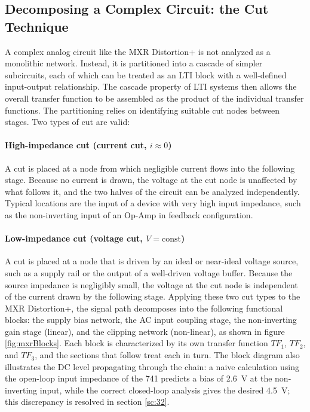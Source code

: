 \subsection{Decomposing a Complex Circuit: the Cut Technique}

A complex analog circuit like the MXR Distortion+ is not analyzed as a monolithic network.
Instead, it is partitioned into a cascade of simpler subcircuits, each of which can be treated as an LTI block with a well-defined input-output relationship.
The cascade property of LTI systems then allows the overall transfer function to be assembled as the product of the individual transfer functions.
The partitioning relies on identifying suitable cut nodes between stages.
Two types of cut are valid:

\paragraph{High-impedance cut (current cut, \(i \approx 0\))} A cut is placed at a node from which negligible current flows into the following stage.
Because no current is drawn, the voltage at the cut node is unaffected by what follows it, and the two halves of the circuit can be analyzed independently.
Typical locations are the input of a device with very high input impedance, such as the non-inverting input of an Op-Amp in feedback configuration.

\paragraph{Low-impedance cut (voltage cut, \(V = \mathrm{const}\))} A cut is placed at a node that is driven by an ideal or near-ideal voltage source, such as a supply rail or the output of a well-driven voltage buffer.
Because the source impedance is negligibly small, the voltage at the cut node is independent of the current drawn by the following stage.
Applying these two cut types to the MXR Distortion+, the signal path decomposes into the following functional blocks: the supply bias network, the AC input coupling stage, the non-inverting gain stage (linear), and the clipping network (non-linear), as shown in figure \ref{fig:mxrBlocks}.
Each block is characterized by its own transfer function \(TF_1\), \(TF_2\), and \(TF_3\), and the sections that follow treat each in turn.
The block diagram also illustrates the DC level propagating through the chain: a naive calculation using the open-loop input impedance of the 741 predicts a bias of \SI{2.6}{\volt} at the non-inverting input, while the correct closed-loop analysis gives the desired \SI{4.5}{\volt}; this discrepancy is resolved in section \ref{sc:32}.

